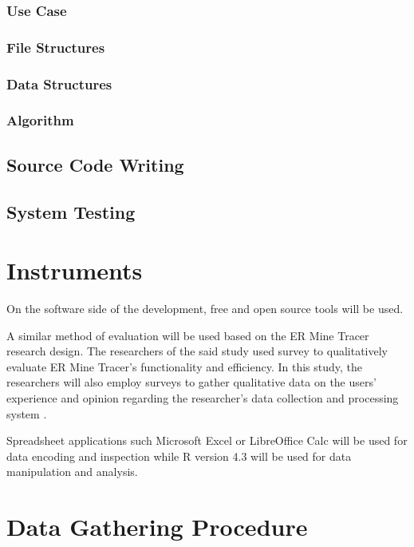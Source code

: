\documentclass[12pt]{report}
\begin{document}
\subsubsection{Use Case}

\subsubsection{File Structures}

\subsubsection{Data Structures}

\subsubsection{Algorithm}

\subsection{Source Code Writing}

\subsection{System Testing}

\section{Instruments}

On the software side of the development, free and open source tools will be used.

A similar method of evaluation will be used based on the ER Mine Tracer research design.
The researchers of the said study used survey to qualitatively evaluate ER Mine Tracer's functionality and efficiency.
In this study, the researchers will also employ surveys to gather qualitative data on the users' experience and opinion regarding the researcher's data collection and processing system \cite{ERMineTracer}.

Spreadsheet applications such Microsoft Excel or LibreOffice Calc will be used for data encoding and inspection while R version 4.3 \cite{R} will be used for data manipulation and analysis.

\section{Data Gathering Procedure}
\end{document}
